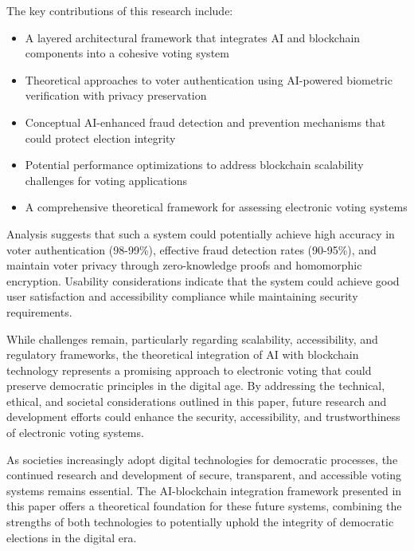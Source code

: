 \documentclass[conference]{IEEEtran}
\begin{document}
The key contributions of this research include:

\begin{itemize}
    \item A layered architectural framework that integrates AI and blockchain components into a cohesive voting system
    \item Theoretical approaches to voter authentication using AI-powered biometric verification with privacy preservation
    \item Conceptual AI-enhanced fraud detection and prevention mechanisms that could protect election integrity
    \item Potential performance optimizations to address blockchain scalability challenges for voting applications
    \item A comprehensive theoretical framework for assessing electronic voting systems
\end{itemize}

Analysis suggests that such a system could potentially achieve high accuracy in voter authentication (98-99\%), effective fraud detection rates (90-95\%), and maintain voter privacy through zero-knowledge proofs and homomorphic encryption. Usability considerations indicate that the system could achieve good user satisfaction and accessibility compliance while maintaining security requirements.

While challenges remain, particularly regarding scalability, accessibility, and regulatory frameworks, the theoretical integration of AI with blockchain technology represents a promising approach to electronic voting that could preserve democratic principles in the digital age. By addressing the technical, ethical, and societal considerations outlined in this paper, future research and development efforts could enhance the security, accessibility, and trustworthiness of electronic voting systems.

As societies increasingly adopt digital technologies for democratic processes, the continued research and development of secure, transparent, and accessible voting systems remains essential. The AI-blockchain integration framework presented in this paper offers a theoretical foundation for these future systems, combining the strengths of both technologies to potentially uphold the integrity of democratic elections in the digital era.
\end{document}
